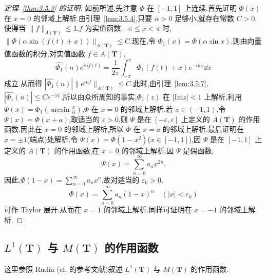 \begin{proof}[定理~\ref{thm:3.5.3} 的证明]
如前所述,先注意 $\Phi$ 在 $[-1, 1]$ 上连续.首先证明 $\Phi(x)$ 在 $x = 0$ 的邻域上解析.由引理~\ref{lem:3.5.4},只要 $\alpha > 0$ 足够小,就存在常数 $C > 0$,使得当 $\|f\|_{A(\mathbf{T})} \leq 1$,$f$ 为实值函数,$-\pi \leq x < \pi$ 时,$\|\Phi(\alpha\sin(f(t) + x))\|_{A(\mathbf{T})} \leq C$.现在,令 $\Phi_{1}(x) = \Phi(\alpha\sin x)$,则由向量值函数的积分,对实值函数 $f \in A(\mathbf{T})$,
\begin{equation*}
\widehat{\Phi_{1}}(n)e^{inf(t)} = \frac{1}{2\pi}\int_{-\pi}^{\pi}\Phi_{1}(f(t) + x)e^{-inx}\dd x
\end{equation*}
成立.从而得 $\left|\widehat{\Phi_{1}}(n)\right|\|e^{inf}\|_{A(\mathbf{T})} \leq C$.此时,由引理~\ref{lem:3.5.7},$\left|\widehat{\Phi_{1}}(n)\right| \leq Ce^{-|n|}$,所以由众所周知的事实,$\Phi_{1}(z)$ 在 $|\mathrm{Im}z| < 1$ 上解析,利用 $\Phi(x) = \Phi_{1}\left(\arcsin\frac{x}{\alpha}\right)$,$\Phi$ 在 $x = 0$ 的邻域上解析.若 $a \in (-1, 1)$,令 $\Psi(x) = \Phi(x + a)$,取适当的 $\varepsilon > 0$,则 $\Psi$ 是在 $[-\varepsilon, \varepsilon]$ 上定义的 $A(\mathbf{T})$ 的作用函数.因此在 $x = 0$ 的邻域上解析,所以 $\Phi$ 在 $x = a$ 的邻域上解析.最后证明在 $x = \pm 1$(端点)处解析.令 $\Psi(x) = \Phi(1 - x^{2})$($x \in [-1, 1]$),因 $\Psi$ 是在 $[-1, 1]$ 上定义的 $A(\mathbf{T})$ 的作用函数,在 $x = 0$ 的邻域上解析.因 $\Psi$ 是偶函数,
\begin{equation*}
\Psi(x) = \sum_{n=0}^{\infty}a_{n}x^{2n}.
\end{equation*}
因此,$\Phi(1 - x) = \sum_{n=0}^{\infty}a_{n}x^{n}$,故对适当的 $\varepsilon_{0} > 0$,
\begin{equation*}
\Phi(x) = \sum_{n=0}^{\infty}a_{n}(1 - x)^{n} \quad (|x| < \varepsilon_{0})
\end{equation*}
可作 Taylor 展开.从而在 $x = 1$ 的邻域上解析.同样可证明在 $x = -1$ 的邻域上解析.
\end{proof}

\subsection{\texorpdfstring{$L^1(\mathbf{T})$ 与 $M(\mathbf{T})$ 的作用函数}{L1(T) 与 M(T) 的作用函数}}\label{sec:3.5.3}

这里参照 Rudin \cite{ch3:11}(cf. \cite{ch3:11} 的参考文献)叙述 $L^{1}(\mathbf{T})$ 与 $M(\mathbf{T})$ 的作用函数.

